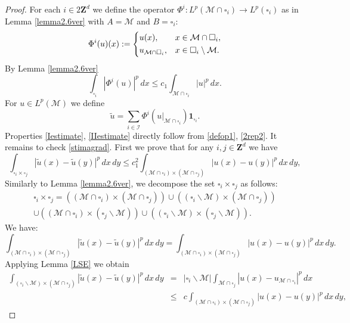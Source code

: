 \documentclass[11pt]{article}
\newcommand{\ext}[1]{\widetilde{#1}}
\def\M{\mathcal{M}}
\newcommand\Z{\mathbf{Z}}
\theoremstyle{remark}
\begin{document}
\begin{appendices}
\begin{proof}
	For each $i \in 2\Z^d$ we define the operator
	$\Phi^{i} :L^p(\M \cap \square_i)\to L^p(\square_i)$ as in Lemma \ref{lemma2.6ver} with $A=\M$ and $B=\square_i$:
	\begin{equation}
		\label{defop1}
		\Phi^{i} (u)(x):=
		\begin{dcases}
			u(x), & x\in \M\cap \square_i, \\
			u_{\M\cap \square_i }, & x\in \square_i \setminus \M.
		\end{dcases}
	\end{equation}
	By Lemma \ref{lemma2.6ver}
	\begin{equation}\label{2rep2}
		\int_{\square_i} |\Phi^{i} (u)|^p\, dx\le c_1\int_{\M \cap \square_i}|u|^p\, dx.
	\end{equation}
	For $u \in L^p(\M)$ we define
	$$ \ext u=\sum_{i \in \mathcal{I}} \Phi^{i} (u|_{\M \cap \square_i})\mathbf{1}_{\square_i}. $$
	Properties \eqref{Iestimate}, \eqref{IIestimate} directly follow from  \eqref{defop1}, \eqref{2rep2}.
	It remains to check \eqref{stimagrad}. First we prove that for
	any $i,j \in \Z^d$ we have
	\begin{equation} \label{wanted1}
		\int_{\square_i \times \square_j} |\ext u(x)-\ext u(y)|^p \,dx \,dy \leq  c_1^2 	\int_{(\M \cap \square_i) \times (\M \cap \square_j)} |u(x)-u(y)|^p \,dx\,dy,
	\end{equation} 	
	Similarly to Lemma \ref{lemma2.6ver}, we decompose the set $\square_i \times \square_j$ as follows:
	\begin{multline*}
		\square_i \times \square_j=((\M \cap \square_i) \times (\M \cap \square_j)) \cup ((\square_i \backslash \M) \times (\M \cap \square_j))
		\\
		\cup ((\M \cap \square_i) \times (\square_j\backslash \M))\cup ((\square_i\backslash \M) \times (\square_j\backslash \M)).
	\end{multline*}
	We have:
	\begin{equation} \label{wanted2}
		\int_{(\M \cap \square_i) \times (\M \cap \square_j )}|\ext u(x)-\ext u(y)|^p \,dx \,dy =	\int_{(\M \cap \square_i) \times (\M \cap \square_j)} |u(x)-u(y)|^p \,dx\,dy.
	\end{equation}  	
	Applying Lemma \ref{LSE} we obtain
	\begin{eqnarray}  
		\int_{(\square_i \backslash \M)\times (\M \cap \square_j) } |\ext u(x)-\ext u(y)|^p \,dx\,dy & = &|\square_i \backslash \M|\int_{\M \cap \square_j} |u(x)  - u_{\M \cap \square_i}|^p \,dx\\ &\leq&    c 	\int_{(\M \cap \square_i) \times (\M \cap \square_j)} |u(x)-u(y)|^p \,dx\,dy,

\end{eqnarray}
\end{proof}
\end{appendices}
\end{document}
